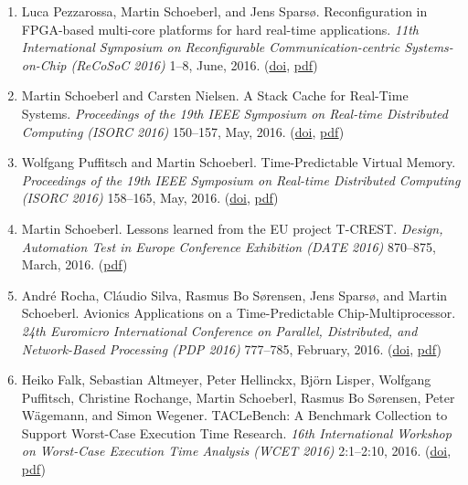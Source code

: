 \begin{enumerate}
\item Luca Pezzarossa, Martin Schoeberl, and Jens Spars{\o}.
 Reconfiguration in FPGA-based multi-core platforms for hard real-time applications.
 \emph{11th International Symposium on Reconfigurable Communication-centric Systems-on-Chip (ReCoSoC 2016)} 1--8, June, 2016.
(\href{http://dx.doi.org/10.1109/ReCoSoC.2016.7533895}{doi}, \href{http://www.jopdesign.com/doc/recon-mc.pdf}{pdf})

\item Martin Schoeberl and Carsten Nielsen.
 A Stack Cache for Real-Time Systems.
 \emph{Proceedings of the 19th IEEE Symposium on Real-time Distributed Computing (ISORC 2016)} 150--157, May, 2016.
(\href{http://dx.doi.org/10.1109/ISORC.2016.29}{doi}, \href{http://www.jopdesign.com/doc/stkcache.pdf}{pdf})

\item Wolfgang Puffitsch and Martin Schoeberl.
 Time-Predictable Virtual Memory.
 \emph{Proceedings of the 19th IEEE Symposium on Real-time Distributed Computing (ISORC 2016)} 158--165, May, 2016.
(\href{http://dx.doi.org/10.1109/ISORC.2016.30}{doi}, \href{http://www.jopdesign.com/doc/tpmmu.pdf}{pdf})

\item Martin Schoeberl.
 Lessons learned from the EU project T-CREST.
 \emph{Design, Automation Test in Europe Conference Exhibition (DATE 2016)} 870--875, March, 2016.
(\href{http://www.jopdesign.com/doc/lessons.pdf}{pdf})

\item Andr{\'e} Rocha, Cl{\'a}udio Silva, Rasmus Bo S{\o}rensen, Jens Spars{\o}, and Martin Schoeberl.
 Avionics Applications on a Time-Predictable Chip-Multiprocessor.
 \emph{24th Euromicro International Conference on Parallel, Distributed, and Network-Based Processing (PDP 2016)} 777--785, February, 2016.
(\href{http://dx.doi.org/10.1109/PDP.2016.36}{doi}, \href{http://www.jopdesign.com/doc/gmvapp.pdf}{pdf})

\item Heiko Falk, Sebastian Altmeyer, Peter Hellinckx, Bj{\"o}rn Lisper, Wolfgang Puffitsch, Christine Rochange, Martin Schoeberl, Rasmus Bo S{\o}rensen, Peter W{\"a}gemann, and Simon Wegener.
 TACLeBench: A Benchmark Collection to Support Worst-Case Execution Time Research.
 \emph{16th International Workshop on Worst-Case Execution Time Analysis (WCET 2016)} 2:1--2:10, 2016.
(\href{http://dx.doi.org/10.4230/OASIcs.WCET.2016.2}{doi}, \href{http://www.jopdesign.com/doc/tacle-bench.pdf}{pdf})



\end{enumerate}
